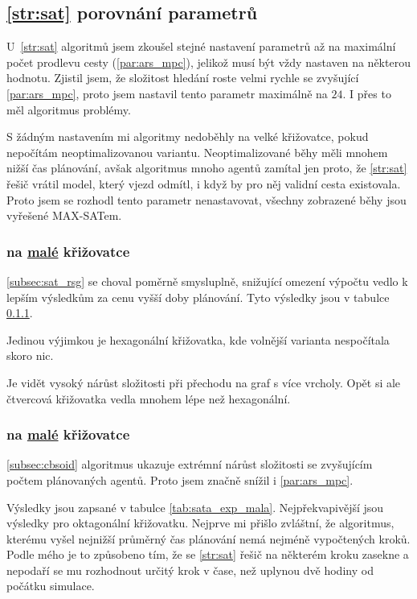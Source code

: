 \subsection{\ref{str:sat} porovnání parametrů}\label{subsec:sat_porovnani_parametru}

U~\ref{str:sat} algoritmů jsem zkoušel stejné nastavení parametrů až na maximální počet prodlevu cesty (\ref{par:ars_mpc}),
jelikož musí být vždy nastaven na některou hodnotu.
Zjistil jsem, že složitost hledání roste velmi rychle se zvyšující \ref{par:ars_mpc},
proto jsem nastavil tento parametr maximálně na $24$.
I přes to měl algoritmus problémy.

S žádným nastavením mi algoritmy nedoběhly na velké křižovatce, pokud nepočítám neoptimalizovanou variantu.
Neoptimalizované běhy měli mnohem nižší čas plánování, avšak algoritmus mnoho agentů zamítal jen proto, že \ref{str:sat}
řešič vrátil model, který vjezd odmítl, i když by pro něj validní cesta existovala.
Proto jsem se rozhodl tento parametr nenastavovat, všechny zobrazené běhy jsou vyřešené \textrm{MAX-SAT}em.

\subsubsection{ na \hyperref[par:data_mala]{malé} křižovatce}
\label{subsubsec:exp_satsg_mala_krizovatka}



\ref{subsec:sat_rsg} se choval poměrně smysluplně, snižující omezení výpočtu vedlo k lepším výsledkům
za cenu vyšší doby plánování.
Tyto výsledky jsou v tabulce \ref{subsubsec:exp_satsg_mala_krizovatka}.

Jedinou výjimkou je hexagonální křižovatka, kde volnější varianta nespočítala skoro nic.

Je vidět vysoký nárůst složitosti při přechodu na graf s více vrcholy.
Opět si ale čtvercová křižovatka vedla mnohem lépe než hexagonální.


\subsubsection{ na \hyperref[par:data_mala]{malé} křižovatce}
\label{subsubsec:exp_sata_mala_krizovatka}

\ref{subsec:cbsoid} algoritmus ukazuje extrémní nárůst složitosti se zvyšujícím počtem plánovaných agentů.
Proto jsem značně snížil i \ref{par:ars_mpc}.


Výsledky jsou zapsané v tabulce \ref{tab:sata_exp_mala}.
Nejpřekvapivější jsou výsledky pro oktagonální křižovatku.
Nejprve mi přišlo zvláštní, že algoritmus, kterému vyšel nejnižší průměrný čas plánování nemá nejméně vypočtených kroků.
Podle mého je to způsobeno tím, že se \ref{str:sat} řešič na některém kroku zasekne a nepodaří se mu rozhodnout
určitý krok v čase, než uplynou dvě hodiny od počátku simulace.
